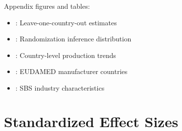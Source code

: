 \documentclass[12pt]{article}
\begin{document}
Appendix figures and tables:
\begin{itemize}
\item {}: Leave-one-country-out estimates
\item {}: Randomization inference distribution
\item {}: Country-level production trends
\item {}: EUDAMED manufacturer countries
\item {}: SBS industry characteristics
\end{itemize}



\section{Standardized Effect Sizes}
\label{sec:sde}
\end{document}

